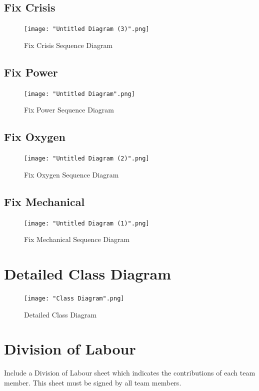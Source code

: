 \documentclass[12pt, titlepage]{article}
\begin{document}
\subsection*{Fix Crisis}
\begin{figure}[H]
\centering
\texttt{[image: "Untitled Diagram (3)".png]}
\caption{Fix Crisis Sequence Diagram}
\end{figure}
\subsection*{Fix Power}
\begin{figure}[H]
\centering
\texttt{[image: "Untitled Diagram".png]}
\caption{Fix Power Sequence Diagram}
\end{figure}
\subsection*{Fix Oxygen}
\begin{figure}[H]
\centering
\texttt{[image: "Untitled Diagram (2)".png]}
\caption{Fix Oxygen Sequence Diagram}
\end{figure}
\subsection*{Fix Mechanical}
\begin{figure}[H]
\centering
\texttt{[image: "Untitled Diagram (1)".png]}
\caption{Fix Mechanical Sequence Diagram}
\end{figure}

\section{Detailed Class Diagram}
\label{sec:detailed_class_diagram}
\begin{figure}[H]
\centering
\texttt{[image: "Class Diagram".png]}
\caption{Detailed Class Diagram}
\end{figure}
\newpage
\appendix
\section{Division of Labour}
\label{sec:division_of_labour}
Include a Division of Labour sheet which indicates the contributions of each team member. This sheet must be signed by all team members.
\end{document}

